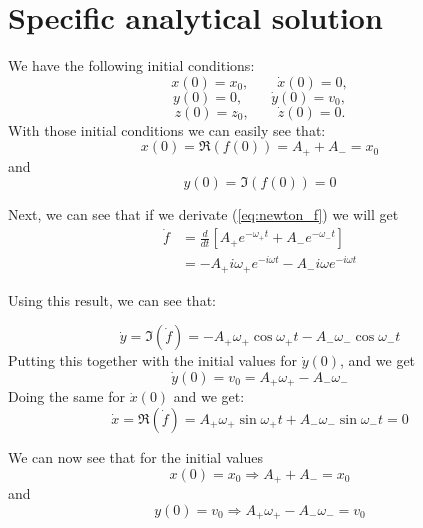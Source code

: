 \documentclass[english,notitlepage,reprint,nofootinbib]{revtex4-1}  %
\begin{document}
	\section{Specific analytical solution} \label{specific_anal}
	We have the following initial conditions:
	$$ x(0) = x_0, \qquad \dot{x}(0) = 0, $$
	$$ y(0) = 0, \qquad \dot{y}(0) = v_0, $$
	$$ z(0) = z_0, \qquad \dot{z}(0) = 0. $$
	With those initial conditions we can easily see that:
	\begin{equation*}
		x(0) = \Re \left( f(0) \right) = A_+ + A_- = x_0
	\end{equation*}
	and
	\begin{equation*}
		y(0) = \Im \left( f(0) \right) = 0
	\end{equation*}

	Next, we can see that if we derivate (\ref{eq:newton_f}) we will get
	\begin{align*}
		\dot{f} &= \frac{d}{dt} \left[ A_+ e^{- \omega_+ t} + A_- e^{- \omega_- t}  \right] \\
		&= -A_+ i \omega_+ e^{-i \omega t} - A_- i \omega e^{-i \omega t}
	\end{align*}

	Using this result, we can see that:

	\begin{equation*}
		\dot{y} = \Im( \dot{f} ) = -A_+ \omega_+ \cos \omega_+ t - A_- \omega_- \cos \omega_- t
	\end{equation*}
	Putting this together with the initial values for $\dot{y} (0)$, and we get
	\begin{equation*}
		\dot{y} (0) = v_0 = A_+ \omega_+ - A_- \omega_- 
	\end{equation*}
	Doing the same for $\dot{x} (0)$ and we get:
	\begin{equation*}
		\dot{x} = \Re ( \dot{f} ) = A_+ \omega_+ \sin \omega_+ t + A_- \omega_- \sin \omega_- t = 0
	\end{equation*}

	We can now see that for the initial values
	\begin{equation} \label{eq:i}
		x(0) = x_0 \Rightarrow A_+ + A_- = x_0
	\end{equation}
	and
	\begin{equation} \label{eq:ii}
		y(0) = v_0 \Rightarrow A_+ \omega_+ - A_- \omega_- = v_0
	\end{equation}
	
\end{document}
